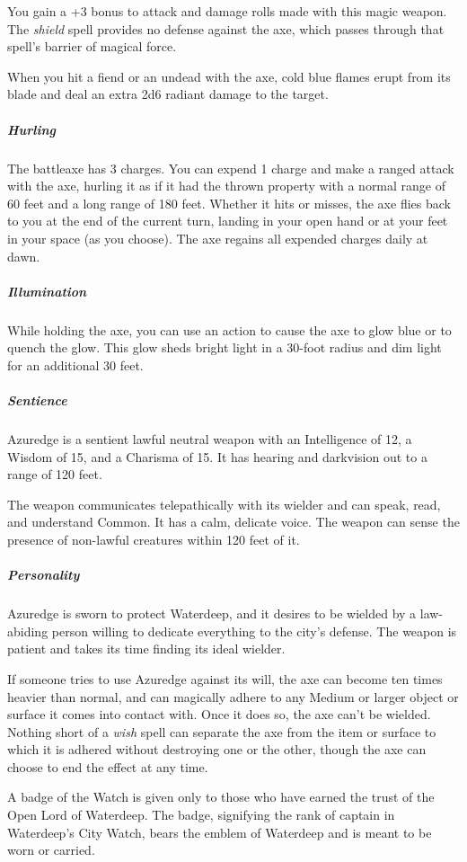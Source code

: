 \documentclass[10pt,a4paper,twoside,bg=print,twocolumn,openany,nodeprecatedcode]{dndbook}
\begin{document}
You gain a +3 bonus to attack and damage rolls made with this magic weapon. The \textit{shield} spell provides no defense against the axe, which passes through that spell's barrier of magical force.

When you hit a fiend or an undead with the axe, cold blue flames erupt from its blade and deal an extra 2d6 radiant damage to the target.

\subparagraph{Hurling}
The battleaxe has 3 charges. You can expend 1 charge and make a ranged attack with the axe, hurling it as if it had the thrown property with a normal range of 60 feet and a long range of 180 feet. Whether it hits or misses, the axe flies back to you at the end of the current turn, landing in your open hand or at your feet in your space (as you choose). The axe regains all expended charges daily at dawn.

\subparagraph{Illumination}
While holding the axe, you can use an action to cause the axe to glow blue or to quench the glow. This glow sheds bright light in a 30-foot radius and dim light for an additional 30 feet.

\subparagraph{Sentience}
Azuredge is a sentient lawful neutral weapon with an Intelligence of 12, a Wisdom of 15, and a Charisma of 15. It has hearing and darkvision out to a range of 120 feet.

The weapon communicates telepathically with its wielder and can speak, read, and understand Common. It has a calm, delicate voice. The weapon can sense the presence of non-lawful creatures within 120 feet of it.

\subparagraph{Personality}
Azuredge is sworn to protect Waterdeep, and it desires to be wielded by a law-abiding person willing to dedicate everything to the city's defense. The weapon is patient and takes its time finding its ideal wielder.

If someone tries to use Azuredge against its will, the axe can become ten times heavier than normal, and can magically adhere to any Medium or larger object or surface it comes into contact with. Once it does so, the axe can't be wielded. Nothing short of a \textit{wish} spell can separate the axe from the item or surface to which it is adhered without destroying one or the other, though the axe can choose to end the effect at any time.

A badge of the Watch is given only to those who have earned the trust of the Open Lord of Waterdeep. The badge, signifying the rank of captain in Waterdeep's City Watch, bears the emblem of Waterdeep and is meant to be worn or carried.
\end{document}
